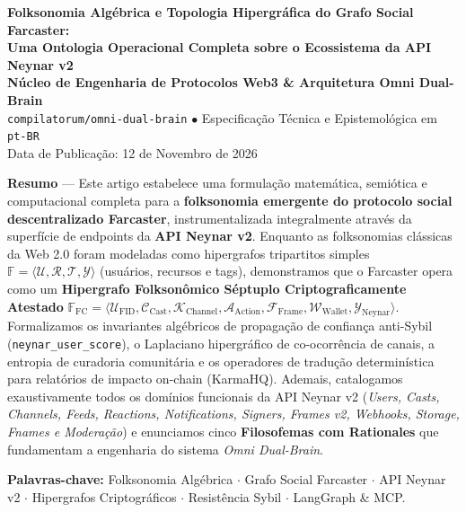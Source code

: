 \documentclass[11pt,a4paper]{article}
\begin{document}
\begin{center}
  {\LARGE\bfseries\color{fcDeep}
  Folksonomia Algébrica e Topologia Hipergráfica do Grafo Social Farcaster:\\[4pt]
  \large Uma Ontologia Operacional Completa sobre o Ecossistema da API Neynar v2}
  \\[12pt]
  {\normalsize\bfseries Núcleo de Engenharia de Protocolos Web3 \& Arquitetura Omni Dual-Brain}\\[2pt]
  {\small\texttt{compilatorum/omni-dual-brain} $\bullet$ Especificação Técnica e Epistemológica em \texttt{pt-BR}}\\[4pt]
  {\footnotesize Data de Publicação: 12 de Novembro de 2026}
\end{center}

\vspace{4pt}
\begin{tcolorbox}[colback=slateBg,colframe=slateBorder,arc=2mm,boxrule=0.8pt]
\textbf{\textcolor{fcDeep}{Resumo}} ---
Este artigo estabelece uma formulação matemática, semiótica e computacional completa para a \textbf{folksonomia emergente do protocolo social descentralizado Farcaster}, instrumentalizada integralmente através da superfície de endpoints da \textbf{API Neynar v2}. Enquanto as folksonomias clássicas da Web 2.0 foram modeladas como hipergrafos tripartitos simples $\mathbb{F} = \langle \mathcal{U}, \mathcal{R}, \mathcal{T}, \mathcal{Y} \rangle$ (usuários, recursos e tags), demonstramos que o Farcaster opera como um \textbf{Hipergrafo Folksonômico Séptuplo Criptograficamente Atestado} $\mathbb{F}_{\text{FC}} = \langle \mathcal{U}_{\text{FID}}, \mathcal{C}_{\text{Cast}}, \mathcal{K}_{\text{Channel}}, \mathcal{A}_{\text{Action}}, \mathcal{F}_{\text{Frame}}, \mathcal{W}_{\text{Wallet}}, \mathcal{Y}_{\text{Neynar}} \rangle$. Formalizamos os invariantes algébricos de propagação de confiança anti-Sybil (\texttt{neynar\_user\_score}), o Laplaciano hipergráfico de co-ocorrência de canais, a entropia de curadoria comunitária e os operadores de tradução determinística para relatórios de impacto on-chain (KarmaHQ). Ademais, catalogamos exaustivamente todos os domínios funcionais da API Neynar v2 (\emph{Users, Casts, Channels, Feeds, Reactions, Notifications, Signers, Frames v2, Webhooks, Storage, Fnames e Moderação}) e enunciamos cinco \textbf{Filosofemas com Rationales} que fundamentam a engenharia do sistema \emph{Omni Dual-Brain}.

\vspace{4pt}
\noindent\textbf{\textcolor{fcDeep}{Palavras-chave:}} Folksonomia Algébrica $\cdot$ Grafo Social Farcaster $\cdot$ API Neynar v2 $\cdot$ Hipergrafos Criptográficos $\cdot$ Resistência Sybil $\cdot$ LangGraph \& MCP.
\end{tcolorbox}
\end{document}

